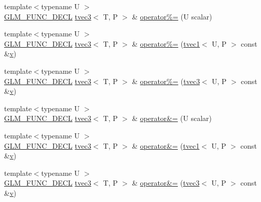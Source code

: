 \begin{DoxyCompactItemize}
\item 
{\footnotesize template$<$typename U $>$ }\\\mbox{\hyperlink{setup_8hpp_ab2d052de21a70539923e9bcbf6e83a51}{G\+L\+M\+\_\+\+F\+U\+N\+C\+\_\+\+D\+E\+CL}} \mbox{\hyperlink{structglm_1_1tvec3}{tvec3}}$<$ T, P $>$ \& \mbox{\hyperlink{structglm_1_1tvec3_a627465a3f104107ba25349a842e8aa61}{operator\%=}} (U scalar)
\item 
{\footnotesize template$<$typename U $>$ }\\\mbox{\hyperlink{setup_8hpp_ab2d052de21a70539923e9bcbf6e83a51}{G\+L\+M\+\_\+\+F\+U\+N\+C\+\_\+\+D\+E\+CL}} \mbox{\hyperlink{structglm_1_1tvec3}{tvec3}}$<$ T, P $>$ \& \mbox{\hyperlink{structglm_1_1tvec3_a4bad68930d445ca78624dee131d95e15}{operator\%=}} (\mbox{\hyperlink{structglm_1_1tvec1}{tvec1}}$<$ U, P $>$ const \&\mbox{\hyperlink{glad_8h_a14cfbe2fc2234f5504618905b69d1e06}{v}})
\item 
{\footnotesize template$<$typename U $>$ }\\\mbox{\hyperlink{setup_8hpp_ab2d052de21a70539923e9bcbf6e83a51}{G\+L\+M\+\_\+\+F\+U\+N\+C\+\_\+\+D\+E\+CL}} \mbox{\hyperlink{structglm_1_1tvec3}{tvec3}}$<$ T, P $>$ \& \mbox{\hyperlink{structglm_1_1tvec3_abb9bf8c109aa14bc40356f31eba946b0}{operator\%=}} (\mbox{\hyperlink{structglm_1_1tvec3}{tvec3}}$<$ U, P $>$ const \&\mbox{\hyperlink{glad_8h_a14cfbe2fc2234f5504618905b69d1e06}{v}})
\item 
{\footnotesize template$<$typename U $>$ }\\\mbox{\hyperlink{setup_8hpp_ab2d052de21a70539923e9bcbf6e83a51}{G\+L\+M\+\_\+\+F\+U\+N\+C\+\_\+\+D\+E\+CL}} \mbox{\hyperlink{structglm_1_1tvec3}{tvec3}}$<$ T, P $>$ \& \mbox{\hyperlink{structglm_1_1tvec3_a94c9bcda41aaad94c8ea1c2331dab436}{operator\&=}} (U scalar)
\item 
{\footnotesize template$<$typename U $>$ }\\\mbox{\hyperlink{setup_8hpp_ab2d052de21a70539923e9bcbf6e83a51}{G\+L\+M\+\_\+\+F\+U\+N\+C\+\_\+\+D\+E\+CL}} \mbox{\hyperlink{structglm_1_1tvec3}{tvec3}}$<$ T, P $>$ \& \mbox{\hyperlink{structglm_1_1tvec3_ad5a0fe7dd37fff314dd01d79887f02be}{operator\&=}} (\mbox{\hyperlink{structglm_1_1tvec1}{tvec1}}$<$ U, P $>$ const \&\mbox{\hyperlink{glad_8h_a14cfbe2fc2234f5504618905b69d1e06}{v}})
\item 
{\footnotesize template$<$typename U $>$ }\\\mbox{\hyperlink{setup_8hpp_ab2d052de21a70539923e9bcbf6e83a51}{G\+L\+M\+\_\+\+F\+U\+N\+C\+\_\+\+D\+E\+CL}} \mbox{\hyperlink{structglm_1_1tvec3}{tvec3}}$<$ T, P $>$ \& \mbox{\hyperlink{structglm_1_1tvec3_aca1630f439ac6a204ed15f3513c057b1}{operator\&=}} (\mbox{\hyperlink{structglm_1_1tvec3}{tvec3}}$<$ U, P $>$ const \&\mbox{\hyperlink{glad_8h_a14cfbe2fc2234f5504618905b69d1e06}{v}})

\end{DoxyCompactItemize}
